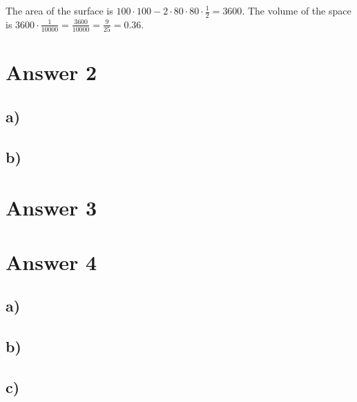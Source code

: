 \documentclass[12pt]{article}
\begin{document}
\noindent
The area of the surface is $100 \cdot 100 - 2 \cdot 80 \cdot 80 \cdot \frac{1}{2} = 3600$. The volume of the space is $3600 \cdot \frac{1}{10000} = \frac{3600}{10000} = \frac{9}{25} = 0.36$.

\section*{Answer 2}

\subsection*{a)} 

\subsection*{b)} 


\section*{Answer 3}


\section*{Answer 4}

\subsection*{a)} 

\subsection*{b)} 

\subsection*{c)} 
\end{document}
